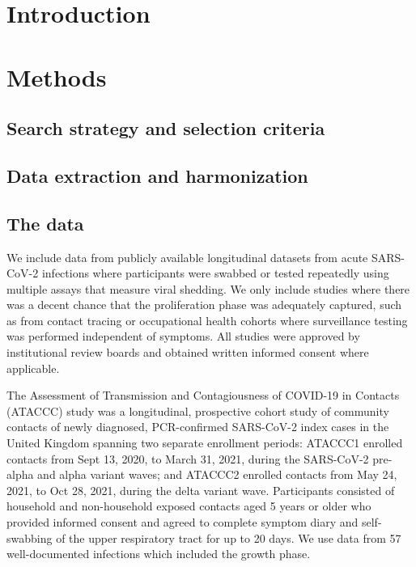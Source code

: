 \documentclass[11pt]{article}
\begin{document}
\section{Introduction} \label{sec:introduction}


\section{Methods} \label{sec:methods}
\subsection{Search strategy and selection criteria} \label{sec:data}

\subsection{Data extraction and harmonization} \label{sec:data}

\subsection{The data} \label{sec:data}
We include data from publicly available longitudinal datasets from acute SARS-CoV-2 infections where participants were swabbed or tested repeatedly using multiple assays that measure viral shedding. We only include studies where there was a decent chance that the proliferation phase was adequately captured, such as from contact tracing or occupational health cohorts where surveillance testing was performed independent of symptoms. All studies were approved by institutional review boards and obtained written informed consent where applicable.

The Assessment of Transmission and Contagiousness of COVID-19 in Contacts (ATACCC) study was a longitudinal, prospective cohort study of community contacts of newly diagnosed, PCR-confirmed SARS-CoV-2 index cases in the United Kingdom spanning two separate enrollment periods: ATACCC1 enrolled contacts from Sept 13, 2020, to March 31, 2021, during the SARS-CoV-2 pre-alpha and alpha variant waves; and ATACCC2 enrolled contacts from May 24, 2021, to Oct 28, 2021, during the delta variant wave. Participants consisted of household and non-household exposed contacts aged 5 years or older who provided informed consent and agreed to complete symptom diary and self-swabbing of the upper respiratory tract for up to 20 days. We use data from 57 well-documented infections which included the growth phase. 
\end{document}
